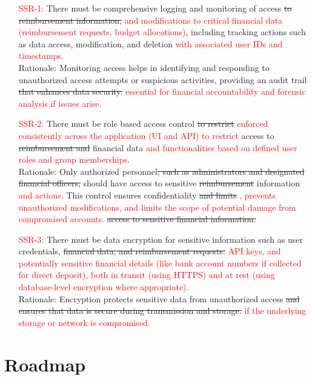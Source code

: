 \documentclass{article}
\begin{document}
\begin{enumerate}
    \item[\textcolor{red}{SSR-1:}] \label{ssr:logging} %
    There must be comprehensive logging and monitoring of access \sout{to reimbursement information,} \textcolor{red}{and modifications to critical financial data (reimbursement requests, budget allocations)}, including tracking actions such as data access, modification, and deletion \textcolor{red}{with associated user IDs and timestamps}. \\
    Rationale: Monitoring access helps in identifying and responding to unauthorized access attempts or suspicious activities, providing an audit trail \sout{that enhances data security.} \textcolor{red}{essential for financial accountability and forensic analysis if issues arise.}
    \item[\textcolor{red}{SSR-2:}] \label{ssr:rbac} %
    There must be role based access control \sout{to restrict} \textcolor{red}{enforced consistently across the application (UI and API) to restrict} access to \sout{reimbursement and} financial data \textcolor{red}{and functionalities based on defined user roles and group memberships}. \\
    Rationale: Only authorized personnel\sout{, such as administrators and designated financial officers,} should have access to sensitive \sout{reimbursement} information \textcolor{red}{and actions}. This control ensures confidentiality \sout{and limits} \textcolor{red}{, prevents unauthorized modifications, and limits the scope of potential damage from compromised accounts.} \sout{access to sensitive financial information.}
    \item[\textcolor{red}{SSR-3:}] \label{ssr:encryption} %
    There must be data encryption for sensitive information such as user credentials, \sout{financial data, and reimbursement requests.} \textcolor{red}{API keys, and potentially sensitive financial details (like bank account numbers if collected for direct deposit), both in transit (using HTTPS) and at rest (using database-level encryption where appropriate).} \\
    Rationale: Encryption protects sensitive data from unauthorized access \sout{and ensures that data is secure during transmission and storage.} \textcolor{red}{if the underlying storage or network is compromised.}
\end{enumerate}

\section{Roadmap} %
\end{document}
